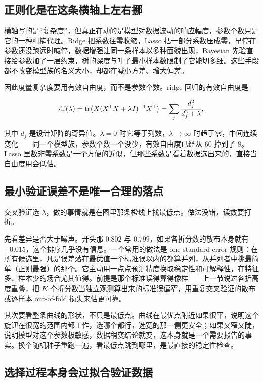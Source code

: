 \subsection{正则化是在这条横轴上左右挪}

横轴写的是``复杂度''，但真正在动的是模型对数据波动的响应幅度，参数个数只是它的一种粗糙代理。Ridge 把系数往零收缩，Lasso 把一部分系数压成零，早停在参数还没跑远时喊停，数据增强让同一条样本以多种面貌出现，Bayesian 先验直接给参数加了一层约束，树的深度与叶子最小样本数限制了它能切多细。这些手段都不改变模型族的名义大小，却都在减小方差、增大偏差。

因此度量复杂度要用有效自由度，而不是参数个数。ridge 回归的有效自由度是

\[
\mathrm{df}(\lambda)=\operatorname{tr}\bigl(X(X^{\mathsf{T}}X+\lambda I)^{-1}X^{\mathsf{T}}\bigr)=\sum_{j}\frac{d_j^2}{d_j^2+\lambda},
\]

其中 \(d_j\) 是设计矩阵的奇异值。\(\lambda=0\) 时它等于列数，\(\lambda\to\infty\) 时趋于零，中间连续变化——同一个模型族，参数个数一个没少，有效自由度已经从 \(60\) 掉到了 \(8\)。Lasso 里数非零系数是一个方便的近似，但那些系数是看着数据选出来的，直接当自由度用会低估。

\subsection{最小验证误差不是唯一合理的落点}

交叉验证选 \(\lambda\)，做的事情就是在图里那条橙线上找最低点。做法没错，读数要打折。

先看差异是否大于噪声。开头那 \(0.802\) 与 \(0.799\)，如果各折分数的散布本身就有 \(\pm0.015\)，这个排序几乎没有信息。一个常用的做法是 one-standard-error 规则：在所有候选里，凡是误差落在最优值一个标准误以内的都算并列，从并列者中挑最简单（正则最强）的那个。它主动用一点点预测精度换取稳定性和可解释性，在特征多、样本少的场合尤其值得。前提是那个标准误得算得像样——上一节说过各折高度重叠，把 \(K\) 个折分数当独立观测算出来的标准误偏窄，用重复交叉验证的散布或逐样本 out-of-fold 损失来估更可靠。

其次要看整条曲线的形状，不只是最低点。曲线在最优点附近如果很平，说明这个旋钮在很宽的范围内都工作，选哪个都行，选宽的那一侧更安全；如果又窄又陡，说明模型对这个参数极敏感，数据稍变结论就变，这本身就是一个需要报告的事实。换个随机种子重跑一遍，看最低点跳到哪里，是最直接的稳定性检查。

\subsection{选择过程本身会过拟合验证数据}

